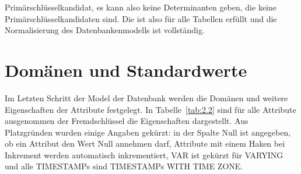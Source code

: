 Primärschlüsselkandidat, es kann also keine Determinanten geben, die keine Primärschlüsselkandidaten sind. Die  ist also für alle Tabellen erfüllt und die Normalisierung des Datenbankenmodells ist vollständig.

\section{Domänen und Standardwerte}\label{sec:Domänen und Standardwerte}

Im Letzten Schritt der Model der Datenbank werden die Domänen und weitere Eigenschaften der Attribute festgelegt. In Tabelle~\ref{tab:2.2} sind für alle Attribute ausgenommen der Fremdschlüssel die Eigenschaften dargestellt. Aus Platzgründen wurden einige Angaben gekürzt: in der Spalte Null ist angegeben, ob ein Attribut den Wert Null annehmen darf, Attribute mit einem Haken bei Inkrement werden automatisch inkrementiert, VAR ist gekürzt für VARYING und alle TIMESTAMPs sind TIMESTAMPs WITH TIME ZONE.\\

